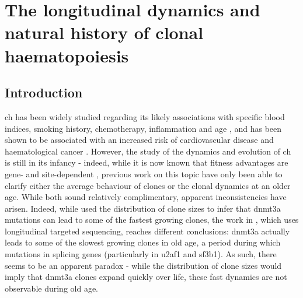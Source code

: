 \chapter{The longitudinal dynamics and natural history of clonal haematopoiesis}

\section{Introduction}

\ac{ch} has been widely studied regarding its likely associations with specific blood indices, smoking history, chemotherapy, inflammation and age \cite{Dawoud2020-af,Coombs2017-ph,McKerrell2015-rl,Cai2018-yi,Bolton2020-ct}, and has been shown to be associated with an increased risk of cardiovascular disease and haematological cancer \cite{Jaiswal2014-rl,Genovese2014-eu, Young2016-du, Xie2014-np, Desai2018-pj, Midic2020-zh, Zink2017-zi, Acuna-Hidalgo2017-ng}. However, the study of the dynamics and evolution of \ac{ch} is still in its infancy - indeed, while it is now known that fitness advantages are gene- and site-dependent \cite{Watson2020-pz,Robertson2021-sw}, previous work on this topic have only been able to clarify either the average behaviour of clones or the clonal dynamics at an older age. While both sound relatively complimentary, apparent inconsistencies have arisen. Indeed, while \cite{Watson2020-pz} used the distribution of clone sizes to infer that \ac{dnmt3a} mutations can lead to some of the fastest growing clones, the work in \cite{Robertson2021-sw}, which uses longitudinal targeted sequencing, reaches different conclusions: \ac{dnmt3a} actually leads to some of the slowest growing clones in old age, a period during which mutations in splicing genes (particularly in \ac{u2af1} and \ac{sf3b1}). As such, there seems to be an apparent paradox - while the distribution of clone sizes would imply that \ac{dnmt3a} clones expand quickly over life, these fast dynamics are not observable during old age. 

